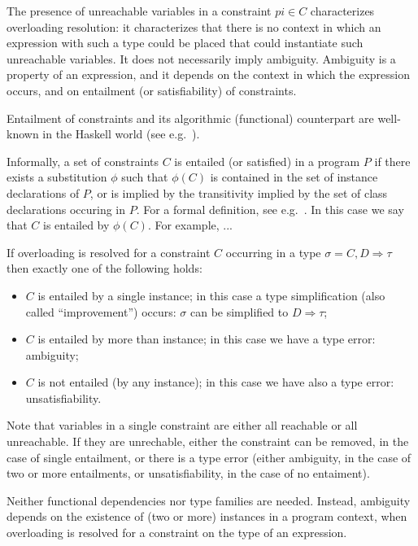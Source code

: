 The presence of unreachable variables in a constraint $pi\in C$
characterizes overloading resolution: it characterizes that there is
no context in which an expression with such a type could be placed
that could instantiate such unreachable variables. It does not
necessarily imply ambiguity. Ambiguity is a property of an expression,
and it depends on the context in which the expression occurs, and on
entailment (or satisfiability) of constraints.

Entailment of constraints and its algorithmic (functional) counterpart
are well-known in the Haskell world (see
e.g.~\cite{MarkJones94a,TheoryOfOverloading,JBCS-Ambiguity-and-constrained-polymorphism}).

Informally, a set of constraints $C$ is entailed (or satisfied) in a
program $P$ if there exists a substitution $\phi$ such that $\phi(C)$
is contained in the set of instance declarations of $P$, or is implied
by the transitivity implied by the set of class declarations occuring
in $P$. For a formal definition, see
e.g.~\cite{MarkJones94a,JBCS-Ambiguity-and-constrained-polymorphism}. In
this case we say that $C$ is entailed by $\phi(C)$. For example, ...

If overloading is resolved for a constraint $C$ occurring in a type
$\sigma = C,D \Rightarrow \tau$ then exactly one of the following
holds:

\begin{itemize}

\item $C$ is entailed by a single instance; in this case a type
  simplification (also called ``improvement'') occurs: $\sigma$ can be
  simplified to $D \Rightarrow \tau$;

\item $C$ is entailed by more than instance; in this case we have a
  type error: ambiguity; 

\item $C$ is not entailed (by any instance); in this case we have also
  a type error: unsatisfiability.

\end{itemize}

Note that variables in a single constraint are either all reachable or
all unreachable. If they are unrechable, either the constraint can be
removed, in the case of single entailment, or there is a type error
(either ambiguity, in the case of two or more entailments, or
unsatisfiability, in the case of no entaiment).

Neither functional dependencies nor type families are needed. Instead,
ambiguity depends on the existence of (two or more) instances in a
program context, when overloading is resolved for a constraint on the
type of an expression.

